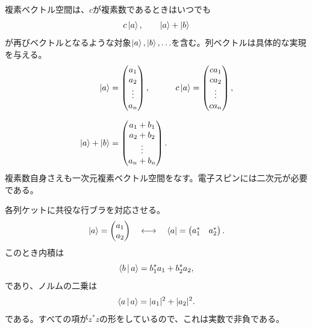 複素ベクトル空間は、\(c\)が複素数であるときはいつでも
\begin{equation}
  c\left\lvert a\right\rangle,
  \qquad
  \left\lvert a\right\rangle+\left\lvert b\right\rangle
\end{equation}
が再びベクトルとなるような対象\(\left\lvert a\right\rangle,\left\lvert b\right\rangle,\ldots\)を含む。列ベクトルは具体的な実現を与える。
\begin{equation}
  \begin{aligned}
    \left\lvert a\right\rangle&=
    \begin{pmatrix}
      a_1\\a_2\\ \vdots\\a_n
    \end{pmatrix},
    &
    c\left\lvert a\right\rangle&=
    \begin{pmatrix}
      ca_1\\ca_2\\ \vdots\\ca_n
    \end{pmatrix},\\[0.7em]
    \left\lvert a\right\rangle+\left\lvert b\right\rangle&=
    \begin{pmatrix}
      a_1+b_1\\a_2+b_2\\ \vdots\\a_n+b_n
    \end{pmatrix}.
  \end{aligned}
  \label{eq:l02-vector-operations}
\end{equation}
複素数自身さえも一次元複素ベクトル空間をなす。電子スピンには二次元が必要である。

各列ケットに共役な行ブラを対応させる。
\begin{equation}
  \left\lvert a\right\rangle=
  \begin{pmatrix}a_1\\a_2\end{pmatrix}
  \quad\longleftrightarrow\quad
  \left\langle a\right\rvert=
  \begin{pmatrix}a_1^*&a_2^*\end{pmatrix}.
  \label{eq:l02-bra-ket-components}
\end{equation}
このとき内積は
\begin{equation}
  \left\langle b\,\middle|\,a\right\rangle=b_1^*a_1+b_2^*a_2,
  \label{eq:l02-inner-product}
\end{equation}
であり、ノルムの二乗は
\begin{equation}
  \left\langle a\,\middle|\,a\right\rangle=|a_1|^2+|a_2|^2.
  \label{eq:l02-norm}
\end{equation}
である。すべての項が\(z^*z\)の形をしているので、これは実数で非負である。

